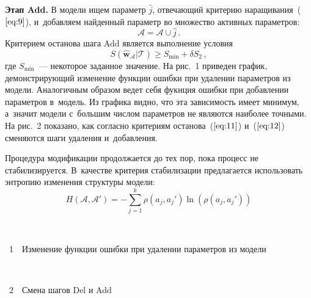 \begin{multicols}{2}
\textbf{Этап Add.} В модели ищем параметр $\hat{j}$,
отвечающий критерию наращивания~($\ref{eq:9}$), и~добавляем найденный параметр
во множество активных параметров:
\begin{equation*}
\mathcal{A} = \mathcal{A} \cup {\hat{j}}\,.
\end{equation*}
Критерием останова шага Add является выполнение условия
\begin{equation}
\label{eq:12}
S(\mathbf{\hat{w}}_{\mathcal{A}}|\mathcal{T}) \geq S_{\min} + \delta S_2\,,
\end{equation}
где $S_{\min}$~--- некоторое заданное значение. На рис.~1
приведен график, демонстрирующий изменение функции ошибки при удалении
параметров из модели. Аналогичным образом ведет себя фукнция ошибки при
добавлении параметров в~модель. Из графика видно, что эта зависимость имеет
минимум, а~значит модели с~большим чис\-лом параметров
не являются наиболее точными. На рис.~2 показано, как
согласно критериям останова~($\ref{eq:11}$) и~($\ref{eq:12}$) сменяются
шаги удаления и~добавления.



Процедура модификации продолжается до тех пор, пока процесс не стабилизируется.
В~качестве критерия стабилизации предлагается использовать энтропию изменения
структуры модели:
\begin{equation}
\label{eq:13}
H(\mathcal{A},\mathcal{A'}) =
-\sum\limits_{j=1}^{k} {\rho(a_j, a_j')\ln(\rho(a_j, a_j'))}
\end{equation}

\begin{center}  %
\vspace*{1pt}
\mbox{%
 \epsfxsize=80mm %
 }
\end{center}


\noindent
{{\figurename~1}\ \ \small{Изменение функции ошибки при удалении параметров из модели}}


\vspace*{6pt}


\addtocounter{figure}{1}

\begin{center}  %
\vspace*{1pt}
\mbox{%
 \epsfxsize=80mm %
 }

\vspace*{6pt}


{{\figurename~2}\ \ \small{Смена шагов Del и Add}}
\end{center}



\end{multicols}
